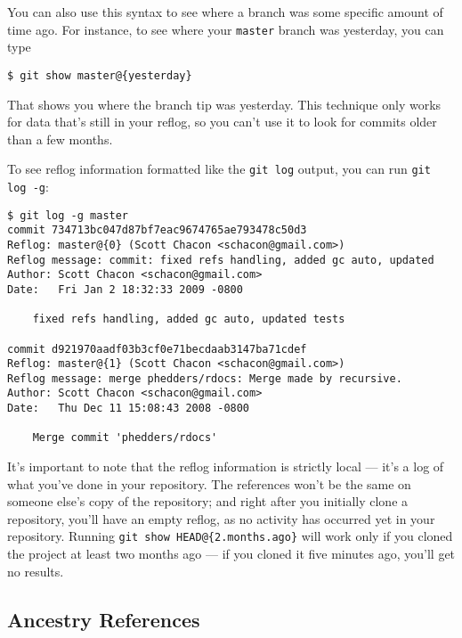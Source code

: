 \documentclass[a4paper]{book}
\begin{document}
You can also use this syntax to see where a branch was some specific amount of time ago. For instance, to see where your \texttt{master} branch was yesterday, you can type

\begin{shaded}\begin{verbatim}
$ git show master@{yesterday}
\end{verbatim}\end{shaded}

That shows you where the branch tip was yesterday. This technique only works for data that's still in your reflog, so you can't use it to look for commits older than a few months.

To see reflog information formatted like the \texttt{git log} output, you can run \texttt{git log -g}:

\begin{shaded}\begin{verbatim}
$ git log -g master
commit 734713bc047d87bf7eac9674765ae793478c50d3
Reflog: master@{0} (Scott Chacon <schacon@gmail.com>)
Reflog message: commit: fixed refs handling, added gc auto, updated
Author: Scott Chacon <schacon@gmail.com>
Date:   Fri Jan 2 18:32:33 2009 -0800

    fixed refs handling, added gc auto, updated tests

commit d921970aadf03b3cf0e71becdaab3147ba71cdef
Reflog: master@{1} (Scott Chacon <schacon@gmail.com>)
Reflog message: merge phedders/rdocs: Merge made by recursive.
Author: Scott Chacon <schacon@gmail.com>
Date:   Thu Dec 11 15:08:43 2008 -0800

    Merge commit 'phedders/rdocs'
\end{verbatim}\end{shaded}

It's important to note that the reflog information is strictly local --- it's a log of what you've done in your repository. The references won't be the same on someone else's copy of the repository; and right after you initially clone a repository, you'll have an empty reflog, as no activity has occurred yet in your repository. Running \texttt{git show HEAD@\{2.months.ago\}} will work only if you cloned the project at least two months ago --- if you cloned it five minutes ago, you'll get no results.

\subsection{Ancestry References}
\end{document}
